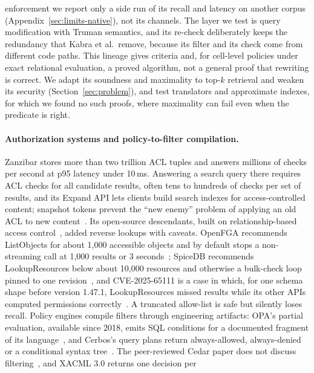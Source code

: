 enforcement we report only a side run of its recall and latency on another corpus (Appendix~\ref{sec:limits-native}), not its channels. The layer we test is query modification with Truman
semantics, and
its re-check deliberately keeps the redundancy that Kabra et al.\ remove, because its filter and its
check come from different code paths. This lineage gives criteria and, for cell-level policies under exact relational evaluation, a proved algorithm, not a general proof that rewriting is correct. We
adapt its soundness and maximality to top-$k$ retrieval and weaken its security (Section~\ref{sec:problem}), and test translators and approximate indexes, for which we found no such
proofs, where maximality can fail even when the predicate is right.

\paragraph{Authorization systems and policy-to-filter compilation.}
Zanzibar stores more than two trillion ACL tuples and answers millions of checks per second at p95
latency under 10\,ms. Answering a search query there requires ACL checks for all candidate results, often tens to hundreds of checks per set of results, and its Expand API lets clients build search indexes for access-controlled content; snapshot tokens prevent the ``new enemy''
problem of applying an old ACL to new content~\cite{pang2019zanzibar}. Its open-source descendants,
built on relationship-based access control~\cite{fong2011relationshipbaseda}, added reverse lookups
with caveats. OpenFGA recommends ListObjects for about 1,000 accessible objects and by default stops a
non-streaming call at 1,000 results or 3 seconds~\cite{openfga2026search,openfga2026openfga}; SpiceDB
recommends LookupResources below about 10,000 resources and otherwise a bulk-check loop pinned to one
revision~\cite{authzed2026protecting}, and CVE-2025-65111 is a case in which, for one schema shape before version 1.47.1, LookupResources missed results while its other APIs computed permissions correctly~\cite{nvd2025cve202565111}. A truncated allow-list is safe but silently loses recall.
Policy engines compile filters through engineering artifacts: OPA's partial evaluation, available since
2018, emits SQL conditions for a documented fragment of its
language~\cite{sandall2018write,opa2026evaluating,opa2026writing}, and Cerbos's query plans return
always-allowed, always-denied or a conditional syntax tree~\cite{cerbos2026cerbos}. The peer-reviewed
Cedar paper does not discuss filtering~\cite{cutler2024cedar}, and XACML 3.0 returns one decision per
